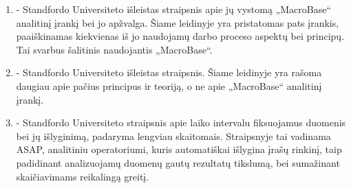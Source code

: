 \documentclass{VUMIFPSbakalaurinis}
\begin{document}
\begin{enumerate}
	\item \textbf{\cite{macrobase_overview}} - Standfordo Universiteto išleistas straipsnis apie jų vystomą „MacroBase“ analitinį įrankį bei jo apžvalga. Šiame leidinyje yra pristatomas pats įrankis, paaiškinamas kiekvienas iš jo naudojamų darbo proceso aspektų bei principų. Tai svarbus šalitinis naudojantis „MacroBase“.
	\item \textbf{\cite{prioritizing_attention}} - Standfordo Universiteto išleistas straipsnis. Šiame leidinyje yra rašoma daugiau apie pačius principus ir teoriją, o ne apie  „MacroBase“ analitinį įrankį.
	\item \textbf{\cite{asap}} - Standfordo Universiteto straipsnis apie laiko intervalu fiksuojamus duomenis bei jų išlyginimą, padaryma lengviau skaitomais. Straipsnyje tai vadinama ASAP, analitiniu operatoriumi, kuris automatiškai išlygina įrašų rinkinį, taip padidinant analizuojamų duomenų gautų rezultatų tikslumą, bei sumažinant skaičiavimams reikalingą greitį.
\end{enumerate}






\end{document}
